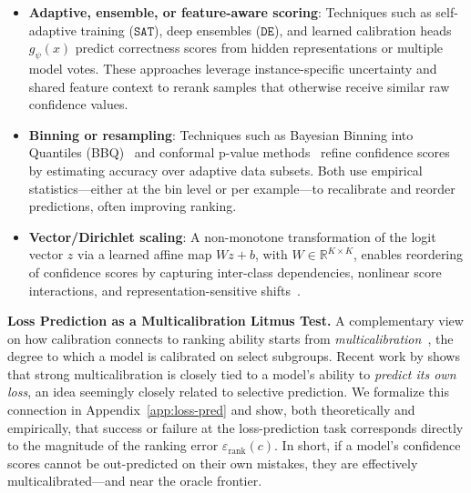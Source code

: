 \begin{itemize}
    \item \textbf{Adaptive, ensemble, or feature-aware scoring}:  
          Techniques such as self-adaptive training (\(\texttt{SAT}\)), deep ensembles (\(\texttt{DE}\)), and learned calibration heads \(g_\psi(x)\) predict correctness scores from hidden representations or multiple model votes. These approaches leverage instance-specific uncertainty and shared feature context to rerank samples that otherwise receive similar raw confidence values.
          
\item \textbf{Binning or resampling}:  
      Techniques such as Bayesian Binning into Quantiles (BBQ)~\citep{naeini2015obtaining} and conformal p-value methods~\citep{angelopoulos2021gentle} refine confidence scores by estimating accuracy over adaptive data subsets. Both use empirical statistics—either at the bin level or per example—to recalibrate and reorder predictions, often improving ranking.


\item \textbf{Vector/Dirichlet scaling}:  
      A non-monotone transformation of the logit vector \(z\) via a learned affine map \(Wz + b\), with \(W \in \mathbb{R}^{K \times K}\), enables reordering of confidence scores by capturing inter-class dependencies, nonlinear score interactions, and representation-sensitive shifts~\citep{kull2019beyond}.



\end{itemize}

\textbf{Loss Prediction as a Multicalibration Litmus Test.}
A complementary view on how calibration connects to ranking ability starts from \emph{multicalibration}~\citep{hebert2018multicalibration},
the degree to which a model is calibrated on select subgroups. Recent work by \citet{gollakota2025loss} shows that strong multicalibration is closely tied to a model's ability to \emph{predict its own loss}, an idea seemingly closely related to selective prediction. We formalize this connection in Appendix~\ref{app:loss-pred} and show, both theoretically and empirically, that success or failure at the loss-prediction task corresponds directly to the magnitude of the ranking error \(\varepsilon_{\text{rank}}(c)\). In short, if a model's confidence scores cannot be out-predicted on their own mistakes, they are effectively multicalibrated—and near the oracle frontier.

